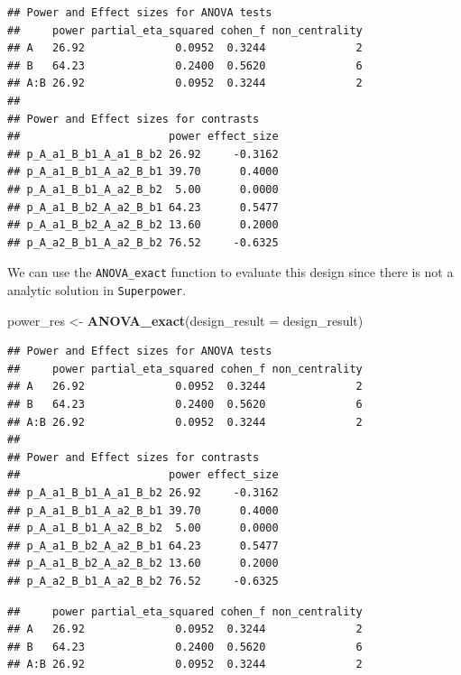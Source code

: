 \documentclass[]{book}
\newenvironment{Shaded}{\begin{snugshade}}{\end{snugshade}}
\newcommand{\DataTypeTok}[1]{\textcolor[rgb]{0.13,0.29,0.53}{#1}}
\newcommand{\KeywordTok}[1]{\textcolor[rgb]{0.13,0.29,0.53}{\textbf{#1}}}
\newcommand{\NormalTok}[1]{#1}
\newcommand{\OperatorTok}[1]{\textcolor[rgb]{0.81,0.36,0.00}{\textbf{#1}}}
\newcommand{\StringTok}[1]{\textcolor[rgb]{0.31,0.60,0.02}{#1}}
\begin{document}
\begin{verbatim}
## Power and Effect sizes for ANOVA tests
##     power partial_eta_squared cohen_f non_centrality
## A   26.92              0.0952  0.3244              2
## B   64.23              0.2400  0.5620              6
## A:B 26.92              0.0952  0.3244              2
## 
## Power and Effect sizes for contrasts
##                       power effect_size
## p_A_a1_B_b1_A_a1_B_b2 26.92     -0.3162
## p_A_a1_B_b1_A_a2_B_b1 39.70      0.4000
## p_A_a1_B_b1_A_a2_B_b2  5.00      0.0000
## p_A_a1_B_b2_A_a2_B_b1 64.23      0.5477
## p_A_a1_B_b2_A_a2_B_b2 13.60      0.2000
## p_A_a2_B_b1_A_a2_B_b2 76.52     -0.6325
\end{verbatim}

We can use the \texttt{ANOVA\_exact} function to evaluate this design since there is not a analytic solution in \texttt{Superpower}.

\begin{Shaded}
\begin{Highlighting}[]
\NormalTok{power_res <-}\StringTok{ }\KeywordTok{ANOVA_exact}\NormalTok{(}\DataTypeTok{design_result =}\NormalTok{ design_result)}
\end{Highlighting}
\end{Shaded}

\begin{verbatim}
## Power and Effect sizes for ANOVA tests
##     power partial_eta_squared cohen_f non_centrality
## A   26.92              0.0952  0.3244              2
## B   64.23              0.2400  0.5620              6
## A:B 26.92              0.0952  0.3244              2
## 
## Power and Effect sizes for contrasts
##                       power effect_size
## p_A_a1_B_b1_A_a1_B_b2 26.92     -0.3162
## p_A_a1_B_b1_A_a2_B_b1 39.70      0.4000
## p_A_a1_B_b1_A_a2_B_b2  5.00      0.0000
## p_A_a1_B_b2_A_a2_B_b1 64.23      0.5477
## p_A_a1_B_b2_A_a2_B_b2 13.60      0.2000
## p_A_a2_B_b1_A_a2_B_b2 76.52     -0.6325
\end{verbatim}

\begin{Shaded}
\end{Shaded}

\begin{verbatim}
##     power partial_eta_squared cohen_f non_centrality
## A   26.92              0.0952  0.3244              2
## B   64.23              0.2400  0.5620              6
## A:B 26.92              0.0952  0.3244              2
\end{verbatim}
\end{document}
